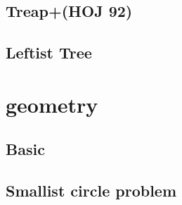 \documentclass[12pt,twocolumn,oneside]{article}
\begin{document}
\subsection{Treap+(HOJ 92)}


\subsection{Leftist Tree}


\section{geometry}
\subsection{Basic}


\subsection{Smallist circle problem}

\end{document}
